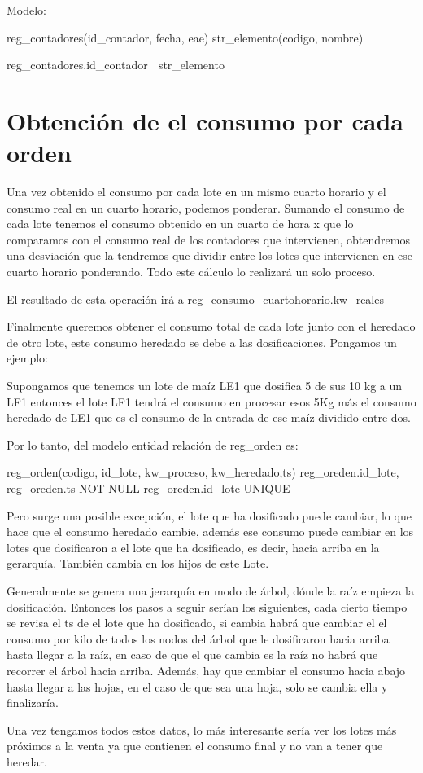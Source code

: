 Modelo:

reg_contadores(id_contador, fecha, eae)
str_elemento(codigo, nombre)

reg_contadores.id_contador  str_elemento

\section*{Obtención de el consumo por cada orden}

Una vez obtenido el consumo por cada lote en un mismo cuarto horario y el consumo real en un cuarto 
horario, podemos ponderar. Sumando el consumo de cada lote tenemos el consumo obtenido en un 
cuarto de hora x que lo comparamos con el consumo real de los contadores que intervienen,
 obtendremos una desviación que la tendremos que dividir entre los lotes que intervienen en ese 
cuarto horario ponderando. Todo este cálculo lo realizará un solo proceso.

El resultado de esta operación irá a reg_consumo_cuartohorario.kw_reales


Finalmente queremos obtener el consumo total de cada lote junto con el heredado de otro lote, este
 consumo heredado se debe a las dosificaciones. Pongamos un ejemplo:

Supongamos que tenemos un lote de maíz LE1 que dosifica 5 de sus 10 kg a un LF1 entonces el lote LF1 
tendrá el consumo en procesar esos 5Kg más el consumo heredado de LE1 que es el consumo de la entrada
 de ese maíz dividido entre dos.

Por lo tanto, del modelo entidad relación de reg_orden es:

reg_orden(codigo, id_lote, kw_proceso, kw_heredado,ts)
reg_oreden.id_lote, reg_oreden.ts NOT NULL
reg_oreden.id_lote UNIQUE

Pero surge una posible excepción, el lote que ha dosificado puede cambiar, lo que hace que el consumo 
heredado cambie, además ese consumo puede cambiar en los lotes que dosificaron a el lote que ha 
dosificado, es decir, hacia arriba en la gerarquía. También cambia en los hijos de este Lote.

Generalmente se genera una jerarquía en modo de árbol, dónde la raíz empieza la dosificación. Entonces 
los pasos a seguir serían los siguientes, cada cierto tiempo se revisa el ts de el lote que ha dosificado,
 si cambia habrá que cambiar el el consumo por kilo de todos los nodos del árbol que le dosificaron hacia
 arriba hasta llegar a la raíz, en caso de que el que cambia es la raíz no habrá que recorrer el árbol hacia
 arriba. Además, hay que cambiar el consumo hacia abajo hasta llegar a las hojas, en el caso de que sea 
una hoja, solo se cambia ella y finalizaría.

Una vez tengamos todos estos datos, lo más interesante sería ver los lotes más próximos a la venta ya 
que contienen el consumo final y no van a tener que heredar.





